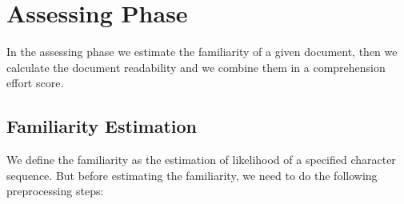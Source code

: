 \documentclass[12pt,mscthesis]{usiinfthesis}
\begin{document}
	\newpage

	\section{Assessing Phase}

	In the assessing phase we estimate the familiarity of a given document, then we calculate the document readability and we combine them in a comprehension effort score.


	\subsection{Familiarity Estimation}
	We define the familiarity as the estimation of likelihood of a specified character sequence. But before estimating the familiarity, we need to do the following preprocessing steps:
\end{document}
